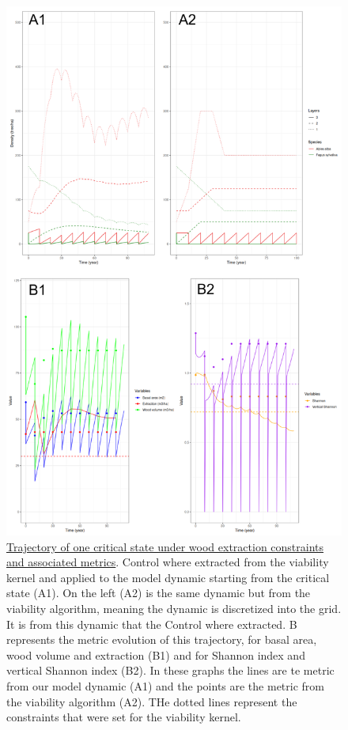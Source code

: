 \documentclass{article}
\begin{document}
\begin{figure}[b]
    \centering
    \includegraphics[height=0.8\textheight]{Figure/Results/Extraction.png}
    \caption{\underline{Trajectory of one critical state under wood extraction constraints and associated metrics}. Control where extracted from the viability kernel and applied to the model dynamic starting from the critical state (A1). On the left (A2) is the same dynamic but from the viability algorithm, meaning the dynamic is discretized into the grid. It is from this dynamic that the Control where extracted. B represents the metric evolution of this trajectory, for basal area, wood volume and extraction (B1) and for Shannon index and vertical Shannon index (B2). In these graphs the lines are te metric from our model dynamic (A1) and the points are the metric from the viability algorithm (A2). THe dotted lines represent the constraints that were set for the viability kernel.}
    \label{fig:Extraction}
\end{figure}
\end{document}
